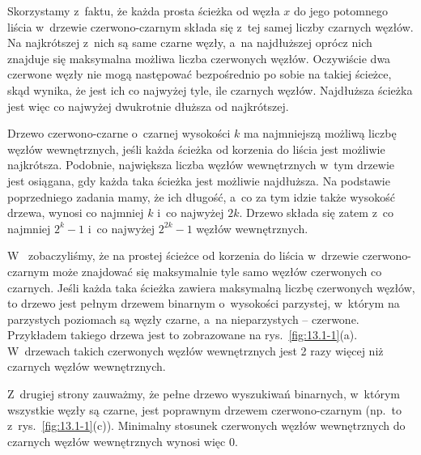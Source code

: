 \exercise %
Skorzystamy z~faktu, że każda prosta ścieżka od węzła $x$ do jego potomnego liścia w~drzewie czerwono-czarnym składa się z~tej samej liczby czarnych węzłów.
Na najkrótszej z~nich są same czarne węzły, a~na najdłuższej oprócz nich znajduje się maksymalna możliwa liczba czerwonych węzłów.
Oczywiście dwa czerwone węzły nie mogą następować bezpośrednio po sobie na takiej ścieżce, skąd wynika, że jest ich co najwyżej tyle, ile czarnych węzłów.
Najdłuższa ścieżka jest więc co najwyżej dwukrotnie dłuższa od najkrótszej.

\exercise %
Drzewo czerwono-czarne o~czarnej wysokości $k$ ma najmniejszą możliwą liczbę węzłów wewnętrznych, jeśli każda ścieżka od korzenia do liścia jest możliwie najkrótsza.
Podobnie, największa liczba węzłów wewnętrznych w~tym drzewie jest osiągana, gdy każda taka ścieżka jest możliwie najdłuższa.
Na podstawie poprzedniego zadania mamy, że ich długość, a~co za tym idzie także wysokość drzewa, wynosi co najmniej $k$ i~co najwyżej $2k$.
Drzewo składa się zatem z~co najmniej $2^k-1$ i~co najwyżej $2^{2k}-1$ węzłów wewnętrznych.

\exercise %
W~ zobaczyliśmy, że na prostej ścieżce od korzenia do liścia w~drzewie czerwono-czarnym może znajdować się maksymalnie tyle samo węzłów czerwonych co czarnych.
Jeśli każda taka ścieżka zawiera maksymalną liczbę czerwonych węzłów, to drzewo jest pełnym drzewem binarnym o~wysokości parzystej, w~którym na parzystych poziomach są węzły czarne, a~na nieparzystych -- czerwone.
Przykładem takiego drzewa jest to zobrazowane na rys.\ \ref{fig:13.1-1}(a).
W~drzewach takich czerwonych węzłów wewnętrznych jest 2 razy więcej niż czarnych węzłów wewnętrznych.

Z~drugiej strony zauważmy, że pełne drzewo wyszukiwań binarnych, w~którym wszystkie węzły są czarne, jest poprawnym drzewem czerwono-czarnym (np.\ to z~rys.\ \ref{fig:13.1-1}(c)).
Minimalny stosunek czerwonych węzłów wewnętrznych do czarnych węzłów wewnętrznych wynosi więc 0.
